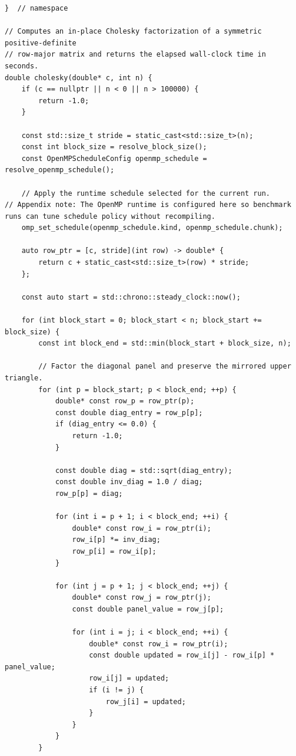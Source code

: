 \begin{lstlisting}[style=appendixcode]
}  // namespace

// Computes an in-place Cholesky factorization of a symmetric positive-definite
// row-major matrix and returns the elapsed wall-clock time in seconds.
double cholesky(double* c, int n) {
    if (c == nullptr || n < 0 || n > 100000) {
        return -1.0;
    }

    const std::size_t stride = static_cast<std::size_t>(n);
    const int block_size = resolve_block_size();
    const OpenMPScheduleConfig openmp_schedule = resolve_openmp_schedule();

    // Apply the runtime schedule selected for the current run.
// Appendix note: The OpenMP runtime is configured here so benchmark runs can tune schedule policy without recompiling.
    omp_set_schedule(openmp_schedule.kind, openmp_schedule.chunk);

    auto row_ptr = [c, stride](int row) -> double* {
        return c + static_cast<std::size_t>(row) * stride;
    };

    const auto start = std::chrono::steady_clock::now();

    for (int block_start = 0; block_start < n; block_start += block_size) {
        const int block_end = std::min(block_start + block_size, n);

        // Factor the diagonal panel and preserve the mirrored upper triangle.
        for (int p = block_start; p < block_end; ++p) {
            double* const row_p = row_ptr(p);
            const double diag_entry = row_p[p];
            if (diag_entry <= 0.0) {
                return -1.0;
            }

            const double diag = std::sqrt(diag_entry);
            const double inv_diag = 1.0 / diag;
            row_p[p] = diag;

            for (int i = p + 1; i < block_end; ++i) {
                double* const row_i = row_ptr(i);
                row_i[p] *= inv_diag;
                row_p[i] = row_i[p];
            }

            for (int j = p + 1; j < block_end; ++j) {
                double* const row_j = row_ptr(j);
                const double panel_value = row_j[p];

                for (int i = j; i < block_end; ++i) {
                    double* const row_i = row_ptr(i);
                    const double updated = row_i[j] - row_i[p] * panel_value;
                    row_i[j] = updated;
                    if (i != j) {
                        row_j[i] = updated;
                    }
                }
            }
        }


\end{lstlisting}
